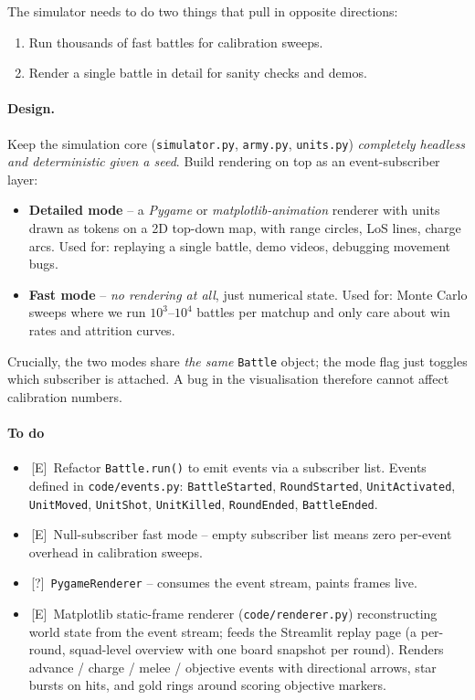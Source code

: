\documentclass[11pt,a4paper]{article}
\newcommand{\eddie}{\textcolor{eddieblue}{\textsf{[E]}}}
\newcommand{\either}{\textcolor{eithergrey}{\textsf{[?]}}}
\newcommand{\todo}{\ding{109}\,}    %
\newcommand{\done}{\ding{51}\,}     %
\begin{document}
The simulator needs to do two things that pull in opposite directions:
\begin{enumerate}[itemsep=2pt]
  \item Run thousands of fast battles for calibration sweeps.
  \item Render a single battle in detail for sanity checks and demos.
\end{enumerate}

\paragraph{Design.} Keep the simulation core
(\texttt{simulator.py}, \texttt{army.py}, \texttt{units.py})
\emph{completely headless and deterministic given a seed}. Build
rendering on top as an event-subscriber layer:

\begin{itemize}[itemsep=4pt]
  \item \textbf{Detailed mode} -- a \emph{Pygame} or
    \emph{matplotlib-animation} renderer with units drawn as tokens on
    a 2D top-down map, with range circles, LoS lines, charge arcs. Used
    for: replaying a single battle, demo videos, debugging movement bugs.
  \item \textbf{Fast mode} -- \emph{no rendering at all}, just numerical
    state. Used for: Monte Carlo sweeps where we run $10^3$--$10^4$
    battles per matchup and only care about win rates and attrition
    curves.
\end{itemize}

Crucially, the two modes share \emph{the same} \texttt{Battle} object;
the mode flag just toggles which subscriber is attached. A bug in
the visualisation therefore cannot affect calibration numbers.

\paragraph{To do}
\begin{itemize}[label={},leftmargin=*,itemsep=2pt]
  \item \done \eddie\ Refactor \texttt{Battle.run()} to emit events
    via a subscriber list. Events defined in \texttt{code/events.py}:
    \texttt{BattleStarted}, \texttt{RoundStarted}, \texttt{UnitActivated},
    \texttt{UnitMoved}, \texttt{UnitShot}, \texttt{UnitKilled},
    \texttt{RoundEnded}, \texttt{BattleEnded}.
  \item \done \eddie\ Null-subscriber fast mode -- empty subscriber list
    means zero per-event overhead in calibration sweeps.
  \item \todo \either\ \texttt{PygameRenderer} -- consumes the event
    stream, paints frames live.
  \item \done \eddie\ Matplotlib static-frame renderer
    (\texttt{code/renderer.py}) reconstructing world state from the
    event stream; feeds the Streamlit replay page (a per-round,
    squad-level overview with one board snapshot per round). Renders
    advance / charge / melee / objective events with directional
    arrows, star bursts on hits, and gold rings around scoring
    objective markers.
\end{itemize}
\end{document}
